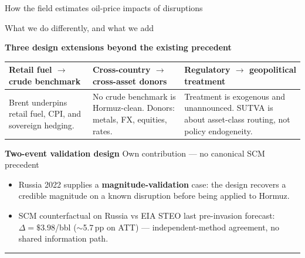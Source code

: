 \documentclass[aspectratio=169,11pt]{beamer}
\newcommand{\hd}[1]{\textbf{#1}}
\begin{document}
\begin{frame}{How the field estimates oil-price impacts of disruptions}
\end{frame}


\begin{frame}{What we do differently, and what we add}
  \scriptsize
  \vspace{0.1em}

  \hd{Three design extensions beyond the existing precedent}
  \vspace{0.15em}

  \begin{tabular}{@{}p{} p{} p{}@{}}
    \toprule
    \hd{Retail fuel $\to$ crude benchmark} &
    \hd{Cross-country $\to$ cross-asset donors} &
    \hd{Regulatory $\to$ geopolitical treatment} \\
    \midrule
    Brent underpins retail fuel, CPI,
and sovereign hedging. &
No crude benchmark is Hormuz-clean.
Donors: metals, FX, equities, rates. &
    Treatment is exogenous and unannounced. SUTVA is about asset-class routing, not policy endogeneity. \\
    \bottomrule
  \end{tabular}

  \vspace{0.35em}
  \hd{Two-event validation design}
  \hfill \textcolor{muted}{Own contribution --- no canonical SCM precedent}
  \vspace{0.1em}
  \begin{itemize}\setlength\itemsep{0.06em}
    \item Russia 2022 supplies a \hd{magnitude-validation} case: the design recovers a credible magnitude on a known disruption before being applied to Hormuz.
    \item SCM counterfactual on Russia vs EIA STEO last pre-invasion forecast:
      $\Delta = \$3.98$/bbl ($\sim$5.7\,pp on ATT) ---
      independent-method agreement, no shared information path.
  \end{itemize}

  \vspace{0.3em}
  \hrule
  \vspace{0.2em}



\end{frame}
\end{document}
